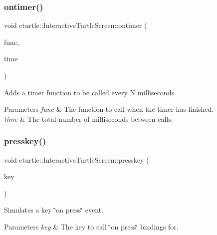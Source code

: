 \subsubsection{\texorpdfstring{ontimer()}{ontimer()}}
{\footnotesize\ttfamily void cturtle\+::\+Interactive\+Turtle\+Screen\+::ontimer (\begin{DoxyParamCaption}\item[{Timer\+Func}]{func,  }\item[{unsigned int}]{time }\end{DoxyParamCaption})\hspace{0.3cm}{\ttfamily [inline]}}



Adds a timer function to be called every N milliseconds. 


\begin{DoxyParams}{Parameters}
{\em func} & The function to call when the timer has finished. \\
\hline
{\em time} & The total number of milliseconds between calls. \\
\hline
\end{DoxyParams}
\mbox{\label{classcturtle_1_1InteractiveTurtleScreen_a4273782c35444bc35afb0a8ea0f6a168}} 
\subsubsection{\texorpdfstring{presskey()}{presskey()}}
{\footnotesize\ttfamily void cturtle\+::\+Interactive\+Turtle\+Screen\+::presskey (\begin{DoxyParamCaption}\item[{Keyboard\+Key}]{key }\end{DoxyParamCaption})\hspace{0.3cm}{\ttfamily [inline]}}



Simulates a key \char`\"{}on press\char`\"{} event. 


\begin{DoxyParams}{Parameters}
{\em key} & The key to call \char`\"{}on press\char`\"{} bindings for. \\
\hline
\end{DoxyParams}
\mbox{\label{classcturtle_1_1InteractiveTurtleScreen_ad0e307da3f48e9e1ce6660c975ca3854}} 
